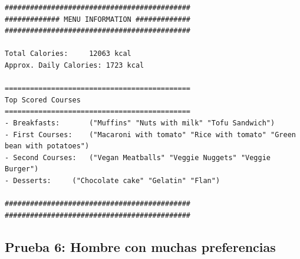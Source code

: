 \documentclass[12]{article}
\begin{document}
\begin{lstlisting}
############################################
############# MENU INFORMATION #############
############################################

Total Calories:		12063 kcal
Approx. Daily Calories:	1723 kcal

============================================
Top Scored Courses
============================================
- Breakfasts:		("Muffins" "Nuts with milk" "Tofu Sandwich")
- First Courses:	("Macaroni with tomato" "Rice with tomato" "Green bean with potatoes")
- Second Courses:	("Vegan Meatballs" "Veggie Nuggets" "Veggie Burger")
- Desserts:		("Chocolate cake" "Gelatin" "Flan")

############################################
############################################
\end{lstlisting}

\subsection{Prueba 6: Hombre con muchas preferencias}
\end{document}
